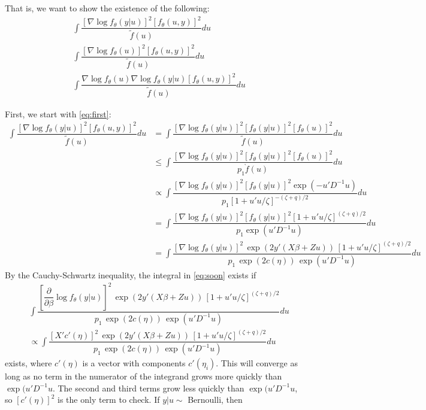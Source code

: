 \documentclass{article}
\begin{document}
That is, we want to show the existence of the following:
\begin{align}
&\int \dfrac{ \left[ \nabla \log f_\theta (y|u) \right]^2 \left[ f_\theta(u,y)\right]^2}{\tilde{f}(u)} du \label{eq:first} \\
&\int \dfrac{ \left[ \nabla \log f_\theta (u) \right]^2 \left[ f_\theta(u,y)\right]^2}{\tilde{f}(u)} du \label{eq:second} \\
&\int \dfrac{  \nabla \log f_\theta (u)  \nabla \log f_\theta (y|u)  \left[ f_\theta(u,y)\right]^2}{\tilde{f}(u)} du \label{eq:third} 
\end{align}

First, we start with \eqref{eq:first}:
\begin{align}
\int \dfrac{ \left[ \nabla \log f_\theta (y|u) \right]^2 \left[ f_\theta(u,y)\right]^2}{\tilde{f}(u)} du 
&=\int \dfrac{ \left[ \nabla \log f_\theta (y|u) \right]^2 \left[ f_\theta(y|u)\right]^2 \left[ f_\theta(u)\right]^2}{\tilde{f}(u)} du \\
&\leq \int \dfrac{ \left[ \nabla \log f_\theta (y|u) \right]^2 \left[ f_\theta(y|u)\right]^2 \left[ f_\theta(u)\right]^2}{p_1\grave{f}(u)} du \\
&\propto \int \dfrac{ \left[ \nabla \log f_\theta (y|u) \right]^2 \left[ f_\theta(y|u)\right]^2 \exp(-u'D^{-1}u)}{p_1\left[ 1+u'u/\zeta  \right]^{-(\zeta+q)/2}} du \\
&= \int \dfrac{ \left[ \nabla \log f_\theta (y|u) \right]^2 \left[ f_\theta(y|u)\right]^2 \left[ 1+u'u/\zeta  \right]^{(\zeta+q)/2} }{p_1 \exp(u'D^{-1}u)} du \\
&= \int \dfrac{ \left[ \nabla \log f_\theta (y|u) \right]^2 \, \exp(2y'(X \beta+Zu)) \,  \left[ 1+u'u/\zeta  \right]^{(\zeta+q)/2} }{ p_1 \, \exp(2 c(\eta)) \,\exp(u'D^{-1}u)} du \label{eq:soon}
\end{align}
By the Cauchy-Schwartz inequality, the integral in \eqref{eq:soon} exists if
\begin{align}
 & \int \dfrac{ \left[\dfrac{\partial}{\partial \beta} \log f_\theta (y|u) \right]^2 \, \exp(2y'(X \beta+Zu)) \,  \left[ 1+u'u/\zeta  \right]^{(\zeta+q)/2} }{ p_1 \, \exp(2 c(\eta)) \,\exp(u'D^{-1}u)} du \nonumber \\
&\propto  \int \dfrac{ \left[X' c'(\eta) \right]^2 \, \exp(2y'(X \beta+Zu)) \,  \left[ 1+u'u/\zeta  \right]^{(\zeta+q)/2} }{ p_1 \, \exp(2 c(\eta)) \,\exp(u'D^{-1}u)} du \label{eq:soon2}
\end{align}
exists, where $c'(\eta)$ is a vector with components $c'(\eta_i)$.  This will converge as long as no term in the numerator of the integrand grows more quickly than $\exp(u'D^{-1}u$. The second and third terms grow less quickly than $\exp(u'D^{-1}u$, so $\left[ c'(\eta)\right]^2$ is the only term to check.  If $y|u \sim$ Bernoulli, then 
\end{document}
